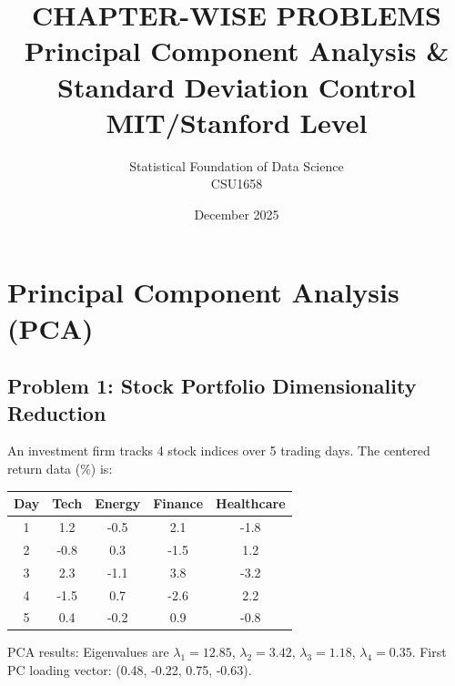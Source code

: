 \documentclass[12pt]{article}
\title{CHAPTER-WISE PROBLEMS\\
\large Principal Component Analysis \& Standard Deviation Control\\
\small MIT/Stanford Level}
\author{Statistical Foundation of Data Science\\
CSU1658}
\date{December 2025}
\begin{document}
\maketitle

\tableofcontents
\newpage


\section{Principal Component Analysis (PCA)}

\subsection*{Problem 1: Stock Portfolio Dimensionality Reduction}

An investment firm tracks 4 stock indices over 5 trading days. The centered return data (\%) is:

\begin{center}
\begin{tabular}{ccccc}
\toprule
Day & Tech & Energy & Finance & Healthcare \\
\midrule
1 & 1.2 & -0.5 & 2.1 & -1.8 \\
2 & -0.8 & 0.3 & -1.5 & 1.2 \\
3 & 2.3 & -1.1 & 3.8 & -3.2 \\
4 & -1.5 & 0.7 & -2.6 & 2.2 \\
5 & 0.4 & -0.2 & 0.9 & -0.8 \\
\bottomrule
\end{tabular}
\end{center}

PCA results: Eigenvalues are $\lambda_1 = 12.85$, $\lambda_2 = 3.42$, $\lambda_3 = 1.18$, $\lambda_4 = 0.35$. First PC loading vector: (0.48, -0.22, 0.75, -0.63).
\end{document}
